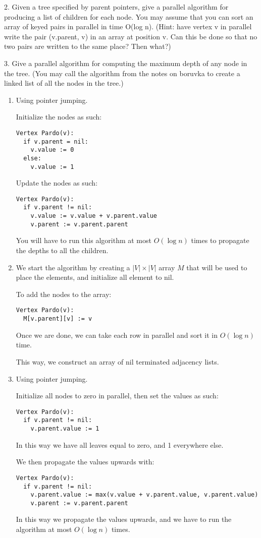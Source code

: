 \documentclass[11pt]{article}
\begin{document}
2. Given a tree specified by parent pointers, give a parallel algorithm for
producing a list of children for
each node. You may assume that you can sort an array of keyed pairs in parallel
in time O(log n).
(Hint: have vertex v in parallel write the pair (v.parent, v) in an array at
position v. Can this be done
so that no two pairs are written to the same place? Then what?)

3. Give a parallel algorithm for computing the maximum depth of any node in the
tree. (You may call
the algorithm from the notes on boruvka to create a linked list of all the nodes
in the tree.)

\begin{enumerate}
\item 
Using pointer jumping.

Initialize the nodes as such:
\begin{verbatim}
Vertex Pardo(v):
  if v.parent = nil:
    v.value := 0
  else:
    v.value := 1
\end{verbatim}

Update the nodes as such:
\begin{verbatim}
Vertex Pardo(v):
  if v.parent != nil:
    v.value := v.value + v.parent.value
    v.parent := v.parent.parent
\end{verbatim}

You will have to run this algorithm at most $O(\log n)$ times to propagate the
depths to all the children.
\item 
We start the algorithm by creating a $|V|\times|V|$ array $M$ that will be used 
to place the elements, and initialize all element to nil.

To add the nodes to the array:
\begin{verbatim}
Vertex Pardo(v):
  M[v.parent][v] := v
\end{verbatim}

Once we are done, we can take each row in parallel and sort it in $O(\log n)$
time. 

This way, we construct an array of nil terminated adjacency lists.
\item
Using pointer jumping.

Initialize all nodes to zero in parallel, then set the values as such:
\begin{verbatim}
Vertex Pardo(v):
  if v.parent != nil:
    v.parent.value := 1
\end{verbatim}

In this way we have all leaves equal to zero, and 1 everywhere else.

We then propagate the values upwards with:
\begin{verbatim}
Vertex Pardo(v):
  if v.parent != nil:
    v.parent.value := max(v.value + v.parent.value, v.parent.value)
    v.parent := v.parent.parent
\end{verbatim}

In this way we propagate the values upwards, and we have to run the algorithm at
most $O(\log n)$ times.

\end{enumerate}
\end{document}
